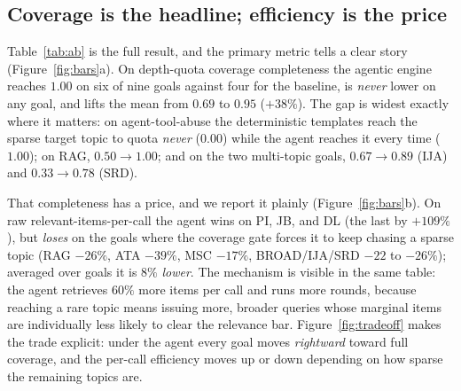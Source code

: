 \documentclass[conference]{IEEEtran}
\begin{document}
\subsection{Coverage is the headline; efficiency is the price}

Table~\ref{tab:ab} is the full result, and the primary metric tells a clear story (Figure~\ref{fig:bars}a). On depth-quota coverage completeness the agentic engine reaches $1.00$ on six of nine goals against four for the baseline, is \emph{never} lower on any goal, and lifts the mean from $0.69$ to $0.95$ ($+38\%$). The gap is widest exactly where it matters: on agent-tool-abuse the deterministic templates reach the sparse target topic to quota \emph{never} ($0.00$) while the agent reaches it every time ($1.00$); on RAG, $0.50\!\to\!1.00$; and on the two multi-topic goals, $0.67\!\to\!0.89$ (IJA) and $0.33\!\to\!0.78$ (SRD).

That completeness has a price, and we report it plainly (Figure~\ref{fig:bars}b). On raw relevant-items-per-call the agent wins on PI, JB, and DL (the last by $+109\%$), but \emph{loses} on the goals where the coverage gate forces it to keep chasing a sparse topic (RAG $-26\%$, ATA $-39\%$, MSC $-17\%$, BROAD/IJA/SRD $-22$ to $-26\%$); averaged over goals it is $8\%$ \emph{lower}. The mechanism is visible in the same table: the agent retrieves $60\%$ more items per call and runs more rounds, because reaching a rare topic means issuing more, broader queries whose marginal items are individually less likely to clear the relevance bar. Figure~\ref{fig:tradeoff} makes the trade explicit: under the agent every goal moves \emph{rightward} toward full coverage, and the per-call efficiency moves up or down depending on how sparse the remaining topics are.
\end{document}
